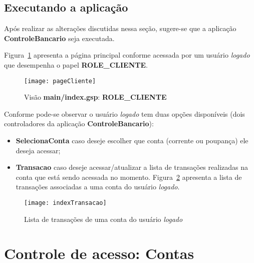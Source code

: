 \subsection{Executando a aplicação}

\vspace{0.5cm}

Após realizar  as alterações discutidas  nessa seção, sugere-se que  a aplicação
{\bf ControleBancario} seja executada. 

Figura~\ref{figPageCliente} apresenta  a página principal  conforme acessada por
um usuário {\it logado} que desempenha o papel {\bf ROLE\_CLIENTE}. 

\begin{figure}[htbp]
\centering\texttt{[image: pageCliente]}
\caption{Visão {\bf main/index.gsp}: {\bf ROLE\_CLIENTE}}
\label{figPageCliente}
\end{figure}

Conforme pode-se  observar o  usuário {\it logado}  tem duas  opções disponíveis
(dois controladores da aplicação {\bf ControleBancario}):

\vspace{0.3cm}

\begin{itemize}

\item {\bf SelecionaConta} caso deseje escolher que conta (corrente ou poupança)
  ele deseja acessar;

\vspace{0.3cm}

\item  {\bf  Transacao} caso  deseje  acessar/atualizar  a  lista de  transações
  realizadas    na    conta    que    está   sendo    acessada    no    momento.
  Figura~\ref{indexTransacaoFig}  apresenta a lista  de transações  associadas a
  uma conta do usuário {\it logado}.  

\end{itemize}

\begin{figure}[htbp]
\centering\texttt{[image: indexTransacao]}
\caption{Lista de transações de uma conta do usuário {\it logado}}
\label{indexTransacaoFig}
\end{figure}

\section{Controle de acesso: Contas}

